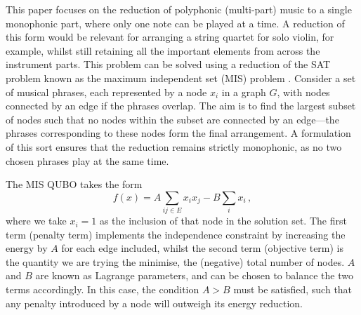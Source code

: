 \documentclass[aps,pra,12pt,onecolumn]{revtex4-2}
\begin{document}
This paper focuses on the reduction of polyphonic (multi-part) music to a single monophonic part, where only one note can be played at a time. A reduction of this form would be relevant for arranging a string quartet for solo violin, for example, whilst still retaining all the important elements from across the instrument parts. This problem can be solved using a reduction of the SAT problem known as the maximum independent set (MIS) problem \cite{lucas_ising_2014}. Consider a set of musical phrases, each represented by a node $x_i$ in a graph $G$, with nodes connected by an edge if the phrases overlap. The aim is to find the largest subset of nodes such that no nodes within the subset are connected by an edge—the phrases corresponding to these nodes form the final arrangement. A formulation of this sort ensures that the reduction remains strictly monophonic, as no two chosen phrases play at the same time.

The MIS QUBO takes the form
\begin{equation}
    f(x)=A\sum_{ij\in E}x_ix_j-B\sum_i x_i\,,
    \label{eq:MIS}
\end{equation}
where we take $x_i=1$ as the inclusion of that node in the solution set. The first term (penalty term) implements the independence constraint by increasing the energy by $A$ for each edge included, whilst the second term (objective term) is the quantity we are trying the minimise, the (negative) total number of nodes. $A$ and $B$ are known as Lagrange parameters, and can be chosen to balance the two terms accordingly. In this case, the condition $A>B$ must be satisfied, such that any penalty introduced by a node will outweigh its energy reduction.
\end{document}

